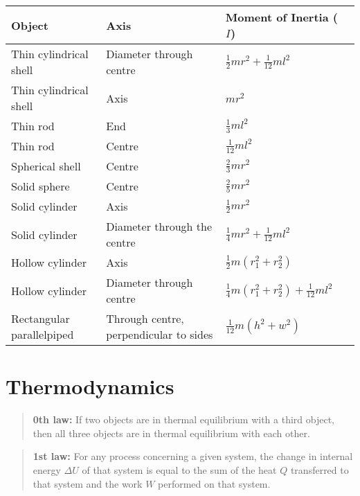 \documentclass[12pt,a4paper]{article}
\begin{document}
\renewcommand{\arraystretch}{1.5} %
\begin{tabular}{l|llc}
	\textbf{Object} & \textbf{Axis} & \textbf{Moment of Inertia (\( I \))} &\\
	\hline
	Thin cylindrical shell & Diameter through centre & \( \frac{1}{2} m r^2 + \frac{1}{12}ml^2\) & 	\\
	
	Thin cylindrical shell & Axis & \( mr^2\) &\\
	
	Thin rod & End & \( \frac{1}{3} m l^2 \) &\\
	
	Thin rod & Centre & \( \frac{1}{12} m l^2 \) &\\
	
	Spherical shell & Centre & \( \frac{2}{3} m r^2 \) &\\
	
	Solid sphere & Centre & \( \frac{2}{5} m r^2 \) &\\
	
	Solid cylinder & Axis & \( \frac{1}{2} m r^2 \) &\\
	
	Solid cylinder & Diameter through the centre& \( \frac{1}{4}m r^2 + \frac{1}{12}m l^2\) &\\
	
	Hollow cylinder & Axis & \( \frac{1}{2}m (r_1^2+ r_2^2) \) &\\
	
	Hollow cylinder & Diameter through centre & \( \frac{1}{4}m (r_1^2+ r_2^2) + \frac{1}{12}ml^2 \) &\\
	
	Rectangular parallelpiped & Through centre, perpendicular to sides & \( \frac{1}{12} m (h^2 + w^2) \) &\\
	
\end{tabular}


	
\section*{Thermodynamics}

\begin{quote}
\textbf{0th law:} 
If two objects are in thermal equilibrium with a third object, then all three objects are in thermal equilibrium with each other.
\end{quote}
\begin{quote}
\textbf{1st law:} 
For any process concerning a given system, the change in internal energy \(\Delta U\) of that system is equal to the sum of the heat \( Q \) transferred to that system and the work \( W \) performed on that system.
\end{quote}
\end{document}
